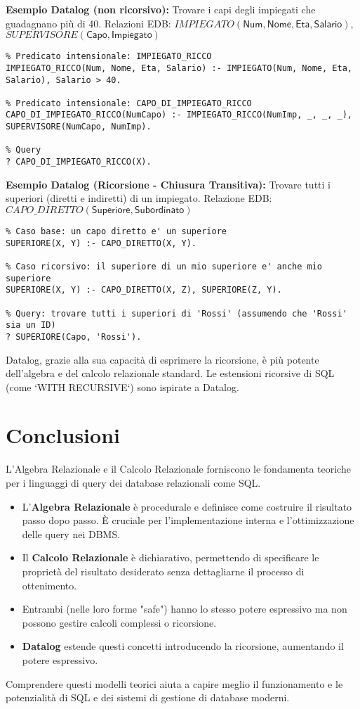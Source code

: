 \documentclass{article}
\newcommand{\Rel}[1]{\textit{#1}} %
\newcommand{\Attr}[1]{\textsf{#1}} %
\begin{document}
	\textbf{Esempio Datalog (non ricorsivo):} Trovare i capi degli impiegati che guadagnano più di 40.
	Relazioni EDB: $\Rel{IMPIEGATO}(\Attr{Num}, \Attr{Nome}, \Attr{Eta}, \Attr{Salario})$, $\Rel{SUPERVISORE}(\Attr{Capo}, \Attr{Impiegato})$
	\begin{verbatim}
% Predicato intensionale: IMPIEGATO_RICCO
IMPIEGATO_RICCO(Num, Nome, Eta, Salario) :- IMPIEGATO(Num, Nome, Eta, Salario), Salario > 40.

% Predicato intensionale: CAPO_DI_IMPIEGATO_RICCO
CAPO_DI_IMPIEGATO_RICCO(NumCapo) :- IMPIEGATO_RICCO(NumImp, _, _, _),
SUPERVISORE(NumCapo, NumImp).

% Query
? CAPO_DI_IMPIEGATO_RICCO(X).
	\end{verbatim}
	
	\textbf{Esempio Datalog (Ricorsione - Chiusura Transitiva):} Trovare tutti i superiori (diretti e indiretti) di un impiegato.
	Relazione EDB: $\Rel{CAPO\_DIRETTO}(\Attr{Superiore}, \Attr{Subordinato})$
	\begin{verbatim}
% Caso base: un capo diretto e' un superiore
SUPERIORE(X, Y) :- CAPO_DIRETTO(X, Y).

% Caso ricorsivo: il superiore di un mio superiore e' anche mio superiore
SUPERIORE(X, Y) :- CAPO_DIRETTO(X, Z), SUPERIORE(Z, Y).

% Query: trovare tutti i superiori di 'Rossi' (assumendo che 'Rossi' sia un ID)
? SUPERIORE(Capo, 'Rossi').
	\end{verbatim}
	Datalog, grazie alla sua capacità di esprimere la ricorsione, è più potente dell'algebra e del calcolo relazionale standard. Le estensioni ricorsive di SQL (come `WITH RECURSIVE`) sono ispirate a Datalog.
	
	\section{Conclusioni}
	L'Algebra Relazionale e il Calcolo Relazionale forniscono le fondamenta teoriche per i linguaggi di query dei database relazionali come SQL.
	\begin{itemize}
		\item L'\textbf{Algebra Relazionale} è procedurale e definisce come costruire il risultato passo dopo passo. È cruciale per l'implementazione interna e l'ottimizzazione delle query nei DBMS.
		\item Il \textbf{Calcolo Relazionale} è dichiarativo, permettendo di specificare le proprietà del risultato desiderato senza dettagliarne il processo di ottenimento.
		\item Entrambi (nelle loro forme "safe") hanno lo stesso potere espressivo ma non possono gestire calcoli complessi o ricorsione.
		\item \textbf{Datalog} estende questi concetti introducendo la ricorsione, aumentando il potere espressivo.
	\end{itemize}
	Comprendere questi modelli teorici aiuta a capire meglio il funzionamento e le potenzialità di SQL e dei sistemi di gestione di database moderni.
	
\end{document}
